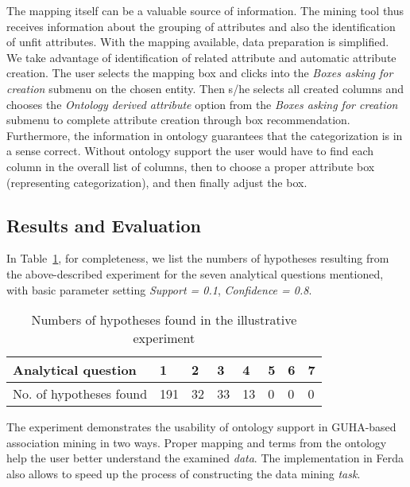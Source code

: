 The mapping itself can be a valuable source of information. 
The mining tool thus receives information about the grouping %
of attributes and also the identification of unfit attributes.
%
With the mapping available, data preparation is simplified. 
We take advantage of identification of related attribute and automatic attribute creation. 
The user selects the mapping box and clicks into the \emph{Boxes asking for creation} submenu on the chosen entity. 
Then s/he selects all created columns and chooses the \emph{Ontology derived attribute} option from the \emph{Boxes asking for creation} submenu to complete attribute creation through box recommendation.
%
%
Furthermore, the information in ontology guarantees that the categorization is in a sense correct. 
Without ontology support the user would have to find each column in the overall list of columns, then to choose a proper attribute box (representing categorization), and then finally adjust the box. 

\subsection{Results and Evaluation}\label{Results}
In Table~\ref{tab:Hypotheses}, for completeness, we list the numbers of hypotheses resulting from the above-described experiment for the seven analytical questions mentioned, with basic parameter setting \emph{Support = 0.1}, \emph{Confidence = 0.8}. 

\begin{table}[ht]
	\centering
		\begin{tabular}{|p{}|p{0,8cm}|p{}|p{}|p{}|p{}|p{}|p{}|}
			\hline
			Analytical question & 1 & 2 & 3 & 4 & 5 & 6 & 7 \\
			\hline
			No. of hypotheses found & 191 & 32 & 33 & 13 & 0 & 0 & 0 \\
			\hline
		\end{tabular}
	\caption{Numbers of hypotheses found in the illustrative experiment}
	\label{tab:Hypotheses}
\end{table}

The experiment demonstrates the usability of ontology support in GUHA-based association mining in two ways. 
Proper mapping and terms from the ontology help the user better understand the examined \emph{data}. 
The implementation in Ferda also allows to speed up the process of constructing the data mining \emph{task}. 